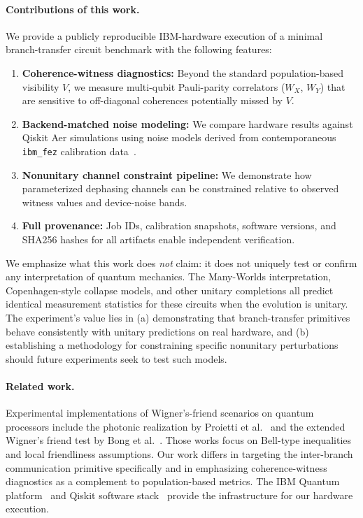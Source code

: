 \documentclass[11pt]{article}
\begin{document}
\paragraph{Contributions of this work.}
We provide a publicly reproducible IBM-hardware execution of a minimal branch-transfer circuit benchmark with the following features:
\begin{enumerate}
    \item \textbf{Coherence-witness diagnostics:} Beyond the standard population-based visibility $V$, we measure multi-qubit Pauli-parity correlators ($W_X$, $W_Y$) that are sensitive to off-diagonal coherences potentially missed by $V$.
    \item \textbf{Backend-matched noise modeling:} We compare hardware results against Qiskit Aer simulations using noise models derived from contemporaneous \texttt{ibm\_fez} calibration data~\cite{qiskitaer}.
    \item \textbf{Nonunitary channel constraint pipeline:} We demonstrate how parameterized dephasing channels can be constrained relative to observed witness values and device-noise bands.
    \item \textbf{Full provenance:} Job IDs, calibration snapshots, software versions, and SHA256 hashes for all artifacts enable independent verification.
\end{enumerate}

We emphasize what this work does \emph{not} claim: it does not uniquely test or confirm any interpretation of quantum mechanics. The Many-Worlds interpretation, Copenhagen-style collapse models, and other unitary completions all predict identical measurement statistics for these circuits when the evolution is unitary. The experiment's value lies in (a) demonstrating that branch-transfer primitives behave consistently with unitary predictions on real hardware, and (b) establishing a methodology for constraining specific nonunitary perturbations should future experiments seek to test such models.

\paragraph{Related work.}
Experimental implementations of Wigner's-friend scenarios on quantum processors include the photonic realization by Proietti et al.~\cite{proietti2019experimental} and the extended Wigner's friend test by Bong et al.~\cite{bong2020strong}. Those works focus on Bell-type inequalities and local friendliness assumptions. Our work differs in targeting the inter-branch communication primitive specifically and in emphasizing coherence-witness diagnostics as a complement to population-based metrics. The IBM Quantum platform~\cite{ibmquantum} and Qiskit software stack~\cite{qiskit,qiskitibmruntime} provide the infrastructure for our hardware execution.
\end{document}
